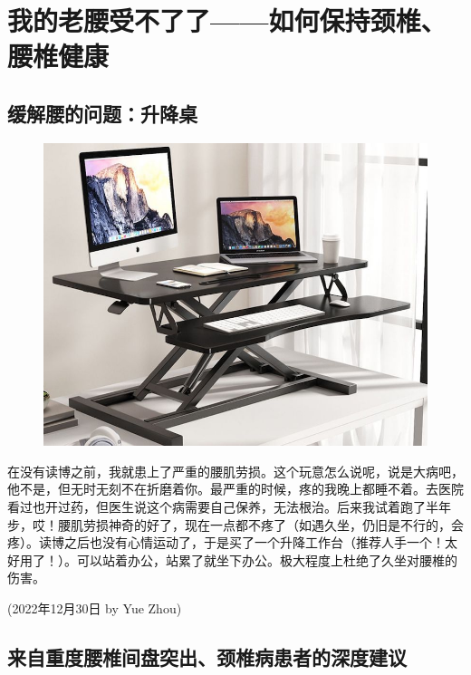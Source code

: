 \section{我的老腰受不了了——如何保持颈椎、腰椎健康}

\subsection{缓解腰的问题：升降桌}

\begin{newminipage}[0.39]
    \begin{figure}[H]
        \includegraphics[width=0.95\columnwidth, right]{author-folder/Yue.Zhou/gongzuotai.jpg}
    \end{figure}
\end{newminipage}
\begin{newminipage}[0.6]
    在没有读博之前，我就患上了严重的腰肌劳损。这个玩意怎么说呢，说是大病吧，他不是，但无时无刻不在折磨着你。最严重的时候，疼的我晚上都睡不着。去医院看过也开过药，但医生说这个病需要自己保养，无法根治。后来我试着跑了半年步，哎！腰肌劳损神奇的好了，现在一点都不疼了（如遇久坐，仍旧是不行的，会疼）。读博之后也没有心情运动了，于是买了一个升降工作台（推荐人手一个！太好用了！）。可以站着办公，站累了就坐下办公。极大程度上杜绝了久坐对腰椎的伤害。
\end{newminipage}

\begin{flushright}
(2022年12月30日 by Yue Zhou)
\end{flushright}

\subsection{来自重度腰椎间盘突出、颈椎病患者的深度建议}

